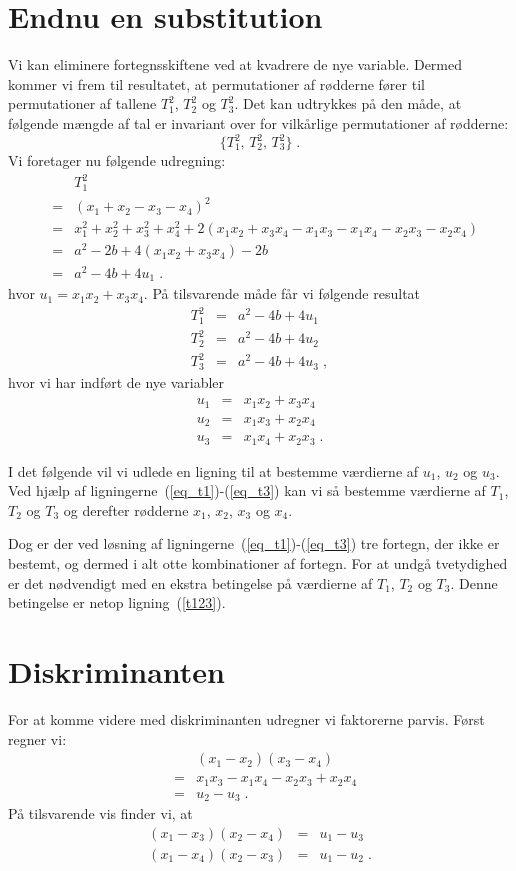 \documentclass[12pt,oneside,a4paper]{article}
\newcommand{\bas}{\begin{eqnarray*}}
\newcommand{\eas}{\end{eqnarray*}}
\newcommand{\bea}{\begin{eqnarray}}
\newcommand{\eea}{\end{eqnarray}}
\begin{document}
\section{Endnu en substitution}
Vi kan eliminere fortegnsskiftene ved at kvadrere de nye variable. Dermed
kommer vi frem til resultatet, at permutationer af rødderne fører til
permutationer af tallene $T_1^2$, $T_2^2$ og $T_3^2$. Det kan udtrykkes på den
måde, at følgende mængde af tal er invariant over for vilkårlige permutationer
af rødderne:
\begin{equation}
    \{T_1^2,\, T_2^2,\, T_3^2\}\;.
    \label{n_set}
\end{equation}
Vi foretager nu følgende udregning:
\bas
&& T_1^2 \\
&=& (x_1+x_2-x_3-x_4)^2 \\
&=& x_1^2+x_2^2+x_3^2+x_4^2 + 2(x_1x_2+x_3x_4-x_1x_3-x_1x_4-x_2x_3-x_2x_4) \\
&=& a^2-2b + 4(x_1x_2+x_3x_4) - 2b \\
&=& a^2-4b + 4u_1 \;.
\eas
hvor $u_1 = x_1x_2+x_3x_4$.
På tilsvarende måde får vi følgende resultat
\bea
T_1^2 &=& a^2-4b + 4u_1 \label{eq_t1}\\
T_2^2 &=& a^2-4b + 4u_2 \label{eq_t2}\\
T_3^2 &=& a^2-4b + 4u_3 \label{eq_t3}\;,
\eea
hvor vi har indført de nye variabler
\bea
u_1 &=& x_1x_2 + x_3x_4 \label{eq_u1}\\
u_2 &=& x_1x_3 + x_2x_4 \label{eq_u2}\\
u_3 &=& x_1x_4 + x_2x_3 \label{eq_u3}\;.
\eea

I det følgende vil vi udlede en ligning til at bestemme værdierne af $u_1$,
$u_2$ og $u_3$. Ved hjælp af ligningerne~(\ref{eq_t1})-(\ref{eq_t3}) kan vi 
så bestemme værdierne af $T_1$, $T_2$ og $T_3$ og derefter rødderne $x_1$, 
$x_2$, $x_3$ og $x_4$.

Dog er der ved løsning af ligningerne~(\ref{eq_t1})-(\ref{eq_t3}) tre fortegn,
der ikke er bestemt, og dermed i alt otte kombinationer af fortegn.
For at undgå tvetydighed er det nødvendigt med en ekstra betingelse på 
værdierne af $T_1$, $T_2$ og $T_3$. Denne betingelse er netop ligning~(\ref{t123}).

\section{Diskriminanten}
For at komme videre med diskriminanten udregner vi faktorerne parvis.
Først regner vi:
\bea
&& (x_1-x_2)(x_3-x_4) \\
&=& x_1x_3-x_1x_4-x_2x_3+x_2x_4 \\
&=& u_2 - u_3\;.
\eea
På tilsvarende vis finder vi, at 
\bea
(x_1-x_3)(x_2-x_4) &=& u_1 - u_3 \\
(x_1-x_4)(x_2-x_3) &=& u_1 - u_2 \;.
\eea
\end{document}
